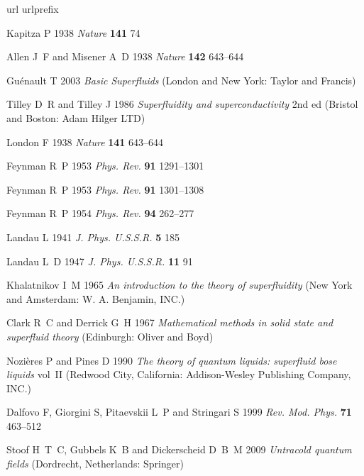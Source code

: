 \documentclass[12pt]{iopart}
\begin{document}
%
\providecommand{\newblock}{}
\begin{thebibliography}{100}
\expandafter\ifx\csname url\endcsname\relax
  \def\url#1{{\tt #1}}\fi
\expandafter\ifx\csname urlprefix\endcsname\relax\def\urlprefix{URL }\fi
\providecommand{\eprint}[2][]{\url{#2}}

Kapitza P 1938 {\em Nature\/} {\bf 141} 74

Allen J~F and Misener A~D 1938 {\em Nature\/} {\bf 142} 643--644

Gu{\'e}nault T 2003 {\em Basic Superfluids\/} (London and New York: Taylor and
  Francis)

Tilley D~R and Tilley J 1986 {\em Superfluidity and superconductivity\/} 2nd ed
  (Bristol and Boston: Adam Hilger LTD)

London F 1938 {\em Nature\/} {\bf 141} 643--644

Feynman R~P 1953 {\em Phys. Rev.\/} {\bf 91} 1291--1301

Feynman R~P 1953 {\em Phys. Rev.\/} {\bf 91} 1301--1308

Feynman R~P 1954 {\em Phys. Rev.\/} {\bf 94} 262--277

Landau L 1941 {\em J. Phys. U.S.S.R.\/} {\bf 5} 185

Landau L~D 1947 {\em J. Phys. U.S.S.R.\/} {\bf 11} 91

Khalatnikov I~M 1965 {\em An introduction to the theory of superfluidity\/}
  (New York and Amsterdam: W. A. Benjamin, INC.)

Clark R~C and Derrick G~H 1967 {\em Mathematical methods in solid state and
  superfluid theory\/} (Edinburgh: Oliver and Boyd)

Nozi{\`e}res P and Pines D 1990 {\em The theory of quantum liquids: superfluid
  bose liquids\/} vol~II (Redwood City, California: Addison-Wesley Publishing
  Company, INC.)

Dalfovo F, Giorgini S, Pitaevskii L~P and Stringari S 1999 {\em Rev. Mod.
  Phys.\/} {\bf 71} 463--512

Stoof H~T~C, Gubbels K~B and Dickerscheid D~B~M 2009 {\em Untracold quantum
  fields\/} (Dordrecht, Netherlands: Springer)


\end{thebibliography}
\end{document}
